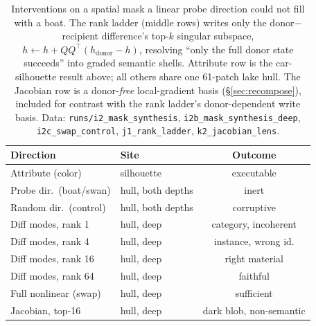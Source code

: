 \documentclass[10pt,twocolumn]{article}
\begin{document}
\begin{table}[t]
\centering
\footnotesize
\setlength{\tabcolsep}{3.5pt}
\begin{tabular}{@{}llc@{}}
\toprule
Direction & Site & Outcome \\
\midrule
Attribute (color) & silhouette & executable \\
Probe dir.\ (boat/swan) & hull, both depths & inert \\
Random dir.\ (control) & hull, both depths & corruptive \\
Diff modes, rank 1 & hull, deep & category, incoherent \\
Diff modes, rank 4 & hull, deep & instance, wrong id. \\
Diff modes, rank 16 & hull, deep & right material \\
Diff modes, rank 64 & hull, deep & faithful \\
Full nonlinear (swap) & hull, deep & sufficient \\
Jacobian, top-16 & hull, deep & dark blob, non-semantic \\
\bottomrule
\end{tabular}
\caption{Interventions on a spatial mask a linear probe direction
could not fill with a boat. The rank ladder (middle rows) writes only
the donor$-$recipient difference's top-$k$ singular subspace,
$h \leftarrow h + QQ^{\top}(h_{\text{donor}}-h)$, resolving ``only the
full donor state succeeds'' into graded semantic shells. Attribute row
is the car-silhouette result above; all others share one 61-patch lake
hull. The Jacobian row is a donor-\emph{free} local-gradient basis
(\S\ref{sec:recompose}), included for contrast with the rank ladder's
donor-dependent write basis. Data: \texttt{runs/i2\_mask\_synthesis},
\texttt{i2b\_mask\_synthesis\_deep}, \texttt{i2c\_swap\_control},
\texttt{j1\_rank\_ladder}, \texttt{k2\_jacobian\_lens}.}
\label{tab:taxonomy}
\end{table}
\end{document}

